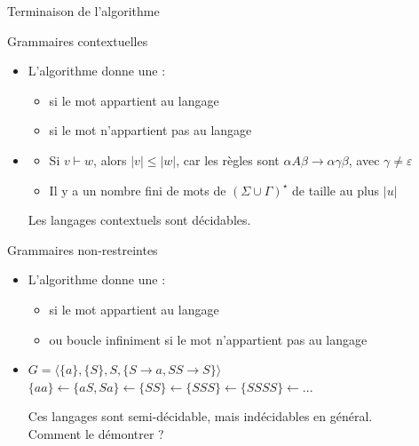 
\begingroup

\begin{frame}[fragile]{Terminaison de l'algorithme}

  \begin{block}{Grammaires contextuelles}
    \begin{itemize}
    \item L'algorithme donne une  :
      \begin{itemize}
      \item \alert{\True} si le mot appartient au langage
      \item \alert{\False} si le mot n'appartient pas au langage
      \end{itemize}
    \item {}
      \begin{itemize}
      \item Si $v \vdash w$, alors $|v| \le |w|$, car les règles sont $\alpha A \beta \rightarrow \alpha \gamma \beta$, avec $\gamma\neq \varepsilon$
      \item Il y a un nombre fini de mots de $(\Sigma \cup \Gamma)^\star$ de taille au plus $|u|$
      \end{itemize}
      \begin{center}
        Les langages contextuels sont \alert{décidables}.
      \end{center}
    \end{itemize}
  \end{block}
  \pause
  \begin{block}{Grammaires non-restreintes}
    \begin{itemize}
    \item L'algorithme donne une  :
      \begin{itemize}
      \item \alert{\True} si le mot appartient au langage
      \item \alert{\False} ou \alert{boucle infiniment} si le mot n'appartient pas au langage
      \end{itemize}
    \item {} {\footnotesize$G = \langle \{a\}, \{S\}, S, \{S \rightarrow a, SS \rightarrow S\}\rangle$\\
      $\{aa\} \leftarrow \{aS, Sa\} \leftarrow \{SS\} \leftarrow \{SSS\} \leftarrow \{SSSS\} \leftarrow ...$}
      \begin{center}
        Ces langages sont \alert{semi-décidable}, mais \alert{indécidables} en général.\\
        \alert{Comment le démontrer ?}
      \end{center}
    \end{itemize}      
  \end{block}

\end{frame}

\endgroup
\endinput

